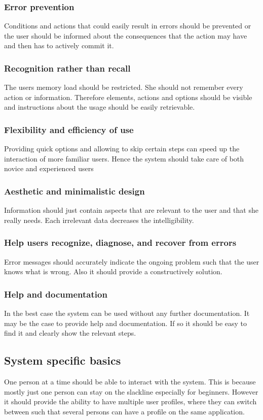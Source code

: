 \subsubsection{Error prevention}
Conditions and actions that could easily result in errors should be prevented or the user should be informed about the consequences that the action may have and then has to actively commit it.
\subsubsection{Recognition rather than recall}
The users memory load should be restricted. She should not remember every action or information. Therefore elements, actions and options should be visible and instructions about the usage should be easily retrievable.
\subsubsection{Flexibility and efficiency of use}
Providing quick options and allowing to skip certain steps can speed up the interaction of more familiar users. Hence the system should take care of both novice and experienced users
\subsubsection{Aesthetic and minimalistic design}
Information should just contain aspects that are relevant to the user and that she really needs. Each irrelevant data decreases the intelligibility.
\subsubsection{Help users recognize, diagnose, and recover from errors}
Error messages should accurately indicate the ongoing problem such that the user knows what is wrong. Also it should provide a constructively solution.
\subsubsection{Help and documentation}
In the best case the system can be used without any further documentation. It may be the case to provide help and documentation. If so it should be easy to find it and clearly show the relevant steps.

\subsection{System specific basics}\label{systemBasics}
One person at a time should be able to interact with the system. This is because mostly just one person can stay on the slackline especially for beginners. However it should provide the ability to have multiple user profiles, where they can switch between such that several persons can have a profile on the same application. 

